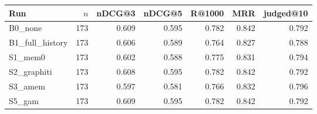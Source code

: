 \begin{tabular}{l r r r r r r}
\toprule
Run & $n$ & nDCG@3 & nDCG@5 & R@1000 & MRR & judged@10 \\
\midrule
B0\_none & 173 & 0.609 & 0.595 & 0.782 & 0.842 & 0.792 \\
B1\_full\_history & 173 & 0.606 & 0.589 & 0.764 & 0.827 & 0.788 \\
S1\_mem0 & 173 & 0.602 & 0.588 & 0.775 & 0.831 & 0.794 \\
S2\_graphiti & 173 & 0.608 & 0.595 & 0.782 & 0.842 & 0.792 \\
S3\_amem & 173 & 0.597 & 0.581 & 0.766 & 0.832 & 0.796 \\
S5\_gam & 173 & 0.609 & 0.595 & 0.782 & 0.842 & 0.792 \\
\bottomrule
\end{tabular}
